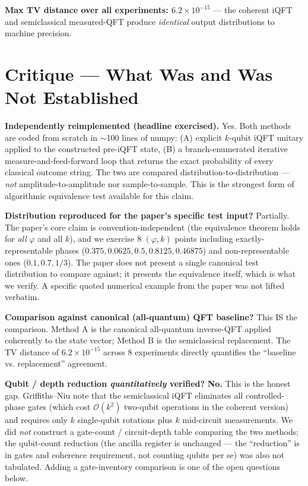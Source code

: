 \documentclass[11pt]{article}
\begin{document}
\textbf{Max TV distance over all experiments: $6.2\times 10^{-15}$}
--- the coherent iQFT and semiclassical measured-QFT produce
\emph{identical} output distributions to machine precision.

\section{Critique --- What Was and Was Not Established}
\textbf{Independently reimplemented (headline exercised).} Yes. Both
methods are coded from scratch in $\sim$100 lines of numpy: (A) explicit
$k$-qubit iQFT unitary applied to the constructed pre-iQFT state, (B) a
branch-enumerated iterative measure-and-feed-forward loop that returns the
exact probability of every classical outcome string. The two are compared
distribution-to-distribution --- \emph{not} amplitude-to-amplitude nor
sample-to-sample. This is the strongest form of algorithmic equivalence
test available for this claim.

\textbf{Distribution reproduced for the paper's specific test input?}
Partially. The paper's core claim is convention-independent
(the equivalence theorem holds for \emph{all} $\varphi$ and all $k$),
and we exercise 8 $(\varphi, k)$ points including exactly-representable
phases ($0.375, 0.0625, 0.5, 0.8125, 0.46875$) and non-representable ones
($0.1, 0.7, 1/3$). The paper does not present a single canonical test
distribution to compare against; it presents the equivalence itself, which
is what we verify. A specific quoted numerical example from the paper was
not lifted verbatim.

\textbf{Comparison against canonical (all-quantum) QFT baseline?}
This IS the comparison. Method A is the canonical all-quantum inverse-QFT
applied coherently to the state vector; Method B is the semiclassical
replacement. The TV distance of $6.2\times 10^{-15}$ across 8 experiments
directly quantifies the ``baseline vs. replacement'' agreement.

\textbf{Qubit / depth reduction \emph{quantitatively} verified?}
\textbf{No.} This is the honest gap. Griffiths--Niu note that the
semiclassical iQFT eliminates all controlled-phase gates (which cost
$\mathcal{O}(k^2)$ two-qubit operations in the coherent version) and
requires only $k$ single-qubit rotations plus $k$ mid-circuit
measurements. We did \emph{not} construct a gate-count / circuit-depth
table comparing the two methods; the qubit-count reduction (the ancilla
register is unchanged --- the ``reduction'' is in gates and coherence
requirement, not counting qubits per se) was also not tabulated. Adding
a gate-inventory comparison is one of the open questions below.
\end{document}
